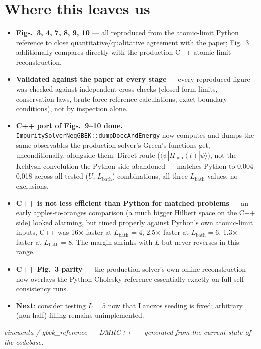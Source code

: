 \documentclass[11pt]{article}
\newif\ifdevnotes
\begin{document}
\section*{Where this leaves us}

\begin{itemize}
  \item \textbf{Figs.\ 3, 4, 7, 8, 9, 10} --- all reproduced from the
    atomic-limit Python reference to close quantitative/qualitative
    agreement with the paper; Fig.\ 3 additionally compares directly with
    the production C++ atomic-limit reconstruction.
  \ifdevnotes
  \item \textbf{Eight bugs found and fixed} across this effort, all
    sign/conjugation/normalization/seeding mistakes in two-time
    bookkeeping, Hamiltonian construction, or ground-state finding ---
    three in the production C++ solver (two Fig.\ 3 callouts, plus the
    lanczosGS seeding bug in the Fig.\ 9 callout) and, in the Python
    reference, a factor-of-2 in the direct kinetic-energy expectation
    value. Every one was caught by an independent cross-check (a
    closed-form limit, a conservation law, a from-scratch brute-force
    reimplementation, or an exact boundary condition), not by
    inspection.
  \else
  \item \textbf{Validated against the paper at every stage} --- every
    reproduced figure was checked against independent cross-checks
    (closed-form limits, conservation laws, brute-force reference
    calculations, exact boundary conditions), not by inspection alone.
  \fi
  \item \textbf{C++ port of Figs.\ 9--10 done.}
    \texttt{ImpuritySolverNeqGBEK::dumpDoccAndEnergy} now computes and
    dumps the same observables the production solver's Green's functions
    get, unconditionally, alongside them. Direct route ($\langle\psi|
    H_\mathrm{hop}(t)|\psi\rangle$), not the Keldysh convolution the
    Python side abandoned --- matches Python to 0.004--0.018 across all
    tested ($U$, $L_\mathrm{bath}$) combinations, all three
    $L_\mathrm{bath}$ values, no exclusions.
  \item \textbf{C++ is not less efficient than Python for matched
    problems} --- an early apples-to-oranges comparison (a much bigger
    Hilbert space on the C++ side) looked alarming, but timed properly
    against Python's own atomic-limit inputs, C++ was 16$\times$ faster
    at $L_\mathrm{bath}=4$, 2.5$\times$ faster at $L_\mathrm{bath}=6$,
    1.3$\times$ faster at $L_\mathrm{bath}=8$. The margin shrinks with
    $L$ but never reverses in this range.
  \item \textbf{C++ Fig.\ 3 parity} --- the production solver's own
    online reconstruction now overlays the Python Cholesky reference
    essentially exactly on full self-consistency runs\ifdevnotes\ (after
    fixing the two-time Green's-function seeding bug, eliminating a
    spurious ``wing'' artifact that used to appear in the reconstructed
    hybridization target Lambda)\fi.
  \item \textbf{Next}: consider testing $L=5$ now that Lanczos seeding is
    fixed; arbitrary (non-half) filling remains unimplemented.
\end{itemize}

\vfill
{\small\it cincuenta / gbek\_reference --- DMRG++ --- generated from the
current state of the codebase.}
\end{document}
